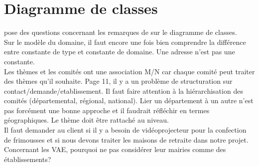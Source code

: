 \documentclass [a4paper] {article}
\begin{document}
\section{Diagramme de classes}
\Julie{} pose des questions concernant les remarques de \nomTuteurPedago{} sur le diagramme de classes.\\
Sur le modèle du domaine, il faut encore une fois bien comprendre la différence entre constante de type et constante de domaine. Une adresse n'est pas une constante. \\
Les thèmes et les comités ont une association M/N car chaque comité peut traiter des thèmes qu'il souhaite. Page 11, il y a un problème de structuration sur contact/demande/etablissement. Il faut faire attention à la hiérarchisation des comités (départemental, régional, national). Lier un département à un autre n'est pas forcément une bonne approche et il faudrait réfléchir en termes géographiques. Le thème doit être rattaché au niveau.\\
Il faut demander au client si il y a besoin de vidéoprojecteur pour la confection de frimousses et si nous devons traiter les maisons de retraite dans notre projet. Concernant les VAE, pourquoi ne pas considérer leur mairies comme des établissements?


\newpage
\end{document}
